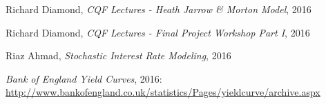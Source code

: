 \documentclass[reqno]{article}
\begin{document}

\newpage


  \begin{thebibliography}{1}

   Richard Diamond, {\em CQF Lectures - Heath Jarrow \& Morton Model},  2016
  
     Richard Diamond, {\em CQF Lectures - Final Project Workshop Part I},  2016
    
    Riaz Ahmad, {\em Stochastic Interest Rate Modeling},  2016
   
    {\em Bank of England Yield Curves},  2016: \url{http://www.bankofengland.co.uk/statistics/Pages/yieldcurve/archive.aspx}
   
%
%
%

  \end{thebibliography}
\end{document}
